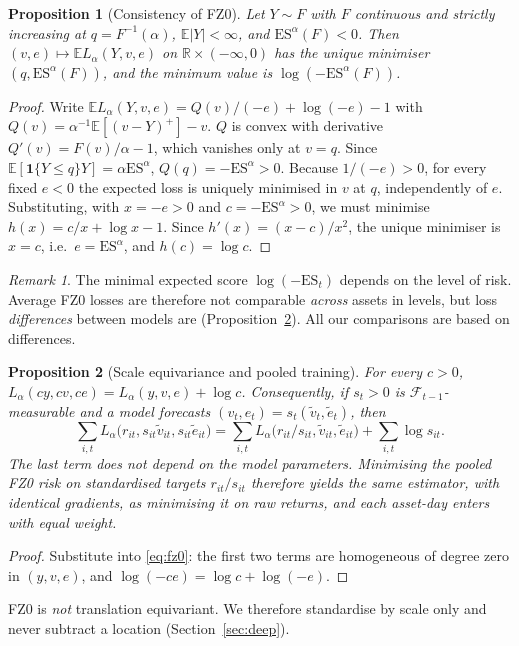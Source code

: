 \documentclass[11pt]{article}
\newtheorem{proposition}{Proposition}
\theoremstyle{remark}
\newtheorem{remark}{Remark}
\newcommand{\1}{\mathbf{1}}
\newcommand{\E}{\mathbb{E}}
\newcommand{\F}{\mathcal{F}}
\newcommand{\ES}{\mathrm{ES}}
\begin{document}
\begin{proposition}[Consistency of FZ0]\label{prop:consistency}
Let $Y\sim F$ with $F$ continuous and strictly increasing at $q=F^{-1}(\alpha)$, $\E|Y|<\infty$, and $\ES^\alpha(F)<0$. Then $(v,e)\mapsto\E L_\alpha(Y,v,e)$ on $\mathbb{R}\times(-\infty,0)$ has the unique minimiser $(q,\ES^\alpha(F))$, and the minimum value is $\log(-\ES^\alpha(F))$.
\end{proposition}
\begin{proof}
Write $\E L_\alpha(Y,v,e)=Q(v)/(-e)+\log(-e)-1$ with $Q(v)=\alpha^{-1}\E[(v-Y)^+]-v$. $Q$ is convex with derivative $Q'(v)=F(v)/\alpha-1$, which vanishes only at $v=q$. Since $\E[\1\{Y\le q\}Y]=\alpha\ES^\alpha$, $Q(q)=-\ES^\alpha>0$. Because $1/(-e)>0$, for every fixed $e<0$ the expected loss is uniquely minimised in $v$ at $q$, independently of $e$. Substituting, with $x=-e>0$ and $c=-\ES^\alpha>0$, we must minimise $h(x)=c/x+\log x-1$. Since $h'(x)=(x-c)/x^2$, the unique minimiser is $x=c$, i.e.\ $e=\ES^\alpha$, and $h(c)=\log c$.
\end{proof}

\begin{remark}
The minimal expected score $\log(-\ES_t)$ depends on the level of risk. Average FZ0 losses are therefore not comparable \emph{across} assets in levels, but loss \emph{differences} between models are (Proposition~\ref{prop:scale}). All our comparisons are based on differences.
\end{remark}

\begin{proposition}[Scale equivariance and pooled training]\label{prop:scale}
For every $c>0$, $L_\alpha(cy,cv,ce)=L_\alpha(y,v,e)+\log c$. Consequently, if $s_t>0$ is $\F_{t-1}$-measurable and a model forecasts $(v_t,e_t)=s_t(\tilde v_t,\tilde e_t)$, then
\[
\sum_{i,t}L_\alpha\bigl(r_{it},s_{it}\tilde v_{it},s_{it}\tilde e_{it}\bigr)=\sum_{i,t}L_\alpha\bigl(r_{it}/s_{it},\tilde v_{it},\tilde e_{it}\bigr)+\sum_{i,t}\log s_{it}.
\]
The last term does not depend on the model parameters. Minimising the pooled FZ0 risk on standardised targets $r_{it}/s_{it}$ therefore yields the same estimator, with identical gradients, as minimising it on raw returns, and each asset-day enters with equal weight.
\end{proposition}
\begin{proof}
Substitute into \eqref{eq:fz0}: the first two terms are homogeneous of degree zero in $(y,v,e)$, and $\log(-ce)=\log c+\log(-e)$.
\end{proof}
FZ0 is \emph{not} translation equivariant. We therefore standardise by scale only and never subtract a location (Section~\ref{sec:deep}).
\end{document}
